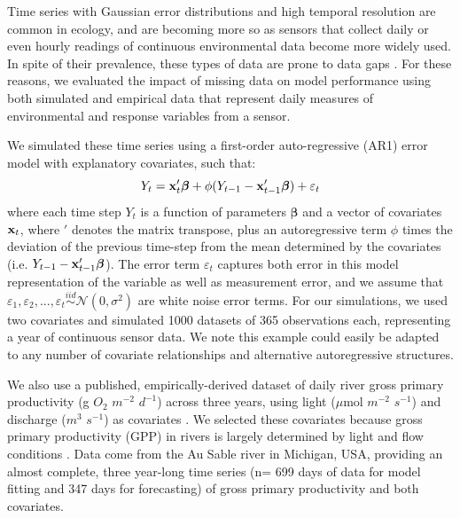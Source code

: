 \documentclass{article}
\begin{document}
\begin{linenumbers}
Time series with Gaussian error distributions and high temporal resolution are common in ecology, and are becoming more so as sensors that collect daily or even hourly readings of continuous environmental data become more widely used. In spite of their prevalence, these types of data are prone to data gaps \citep{chen2013ecological}. For these reasons, we evaluated the impact of missing data on model performance using both simulated and empirical data that represent daily measures of environmental and response variables from a sensor. 

We simulated these time series using a first-order auto-regressive (AR1) error model with explanatory covariates, such that:
\begin{equation}
    Y_t = {\bf x}_t'{\bm \beta} + \phi (Y_{t-1} - {\bf x}_{t-1}'{\bm \beta}) + \varepsilon_t
\label{eq:ar1}
\end{equation}
where each time step \(Y_t\) is a function of parameters \(\bm \beta\) and a vector of covariates \({\bf x}_t\), where $'$ denotes the matrix transpose, plus an autoregressive term \(\phi\) times the deviation of the previous time-step from the mean determined by the covariates (i.e. $Y_{t-1} - {\bf x}_{t-1}'{\bm \beta}$). The error term \(\varepsilon_t\) captures both error in this model representation of the variable as well as measurement error, and we assume that $\varepsilon_1, \varepsilon_2,..., \varepsilon_t \overset{iid}{\sim} \mathcal{N}(0, \sigma^2)$ are white noise error terms. For our simulations, we used two covariates and simulated 1000 datasets of 365 observations each, representing a year of continuous sensor data. We note this example could easily be adapted to any number of covariate relationships and alternative autoregressive structures.

We also use a published, empirically-derived dataset of daily river gross primary productivity (g \(O_2\) \(m^{-2}\) \(d^{-1}\)) across three years, using light (\(\mu\)mol \(m^{-2}\) \(s^{-1}\)) and discharge (\(m^{3}\) \(s^{-1}\)) as covariates \citep{hall_turbidity_2015}. We selected these covariates because gross primary productivity (GPP) in rivers is largely determined by light and flow conditions \citep{bernhardt_metabolic_2018}. Data come from the Au Sable river in Michigan, USA, providing an almost complete, three year-long time series (n= 699 days of data for model fitting and 347 days for forecasting) of gross primary productivity and both covariates. 


\end{linenumbers}
\end{document}
